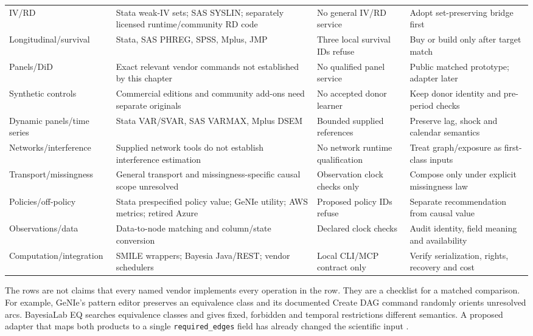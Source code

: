 \begin{longtable}{@{}P{.18\linewidth}P{.29\linewidth}P{.21\linewidth}P{.23\linewidth}@{}}
IV/RD & Stata weak-IV sets; SAS SYSLIN; separately licensed runtime/community RD code & No general IV/RD service & Adopt set-preserving bridge first \\
Longitudinal/survival & Stata, SAS PHREG, SPSS, Mplus, JMP & Three local survival IDs refuse & Buy or build only after target match \\
Panels/DiD & Exact relevant vendor commands not established by this chapter & No qualified panel service & Public matched prototype; adapter later \\
Synthetic controls & Commercial editions and community add-ons need separate originals & No accepted donor learner & Keep donor identity and pre-period checks \\
Dynamic panels/time series & Stata VAR/SVAR, SAS VARMAX, Mplus DSEM & Bounded supplied references & Preserve lag, shock and calendar semantics \\
Networks/interference & Supplied network tools do not establish interference estimation & No network runtime qualification & Treat graph/exposure as first-class inputs \\
Transport/missingness & General transport and missingness-specific causal scope unresolved & Observation clock checks only & Compose only under explicit missingness law \\
Policies/off-policy & Stata prespecified policy value; GeNIe utility; AWS metrics; retired Azure & Proposed policy IDs refuse & Separate recommendation from causal value \\
Observations/data & Data-to-node matching and column/state conversion & Declared clock checks & Audit identity, field meaning and availability \\
Computation/integration & SMILE wrappers; Bayesia Java/REST; vendor schedulers & Local CLI/MCP contract only & Verify serialization, rights, recovery and cost \\
\bottomrule
\end{longtable}
\endgroup

The rows are not claims that every named vendor implements every operation in
the row. They are a checklist for a matched comparison. For example, GeNIe's
pattern editor preserves an equivalence class and its documented Create DAG
command randomly orients unresolved arcs. BayesiaLab EQ searches equivalence
classes and gives fixed, forbidden and temporal restrictions different
semantics. A proposed adapter that maps both products to a single
\texttt{required\_edges} field has already changed the scientific input
\citep{exec13_genie_pattern,exec13_genie_bs,exec13_bayesia_eq}.

